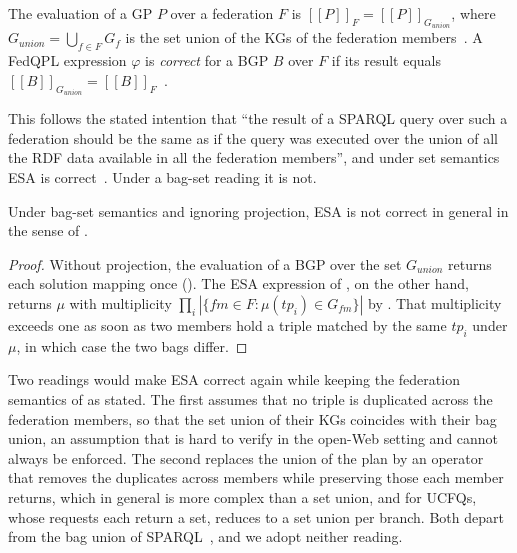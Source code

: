 \begin{definition}\label{def_fedqpl_correctness}
  The evaluation of a \ac{GP} $P$ over a federation $F$ is $[\![P]\!]_F = [\![P]\!]_{G_{\mathit{union}}}$, where $G_{\mathit{union}} = \bigcup_{f \in F} G_f$ is the set union of the \acp{KG} of the federation members~\cite[Def.~3]{Cheng2021}.
  A FedQPL expression $\varphi$ is \emph{correct} for a \ac{BGP} $B$ over $F$ if its result equals $[\![B]\!]_{G_{\mathit{union}}} = [\![B]\!]_F$~\cite[Def.~7]{Cheng2021}.
\end{definition}

This follows the stated intention that ``the result of a SPARQL query over such a federation should be the same as if the query was executed over the union of all the RDF data available in all the federation members'', and under set semantics \ac{ESA} is correct~\cite[Prop.~1]{Cheng2021}.
Under a bag-set reading it is not.

\begin{proposition}\label{prop_fedqpl_esa_incorrect}
Under bag-set semantics and ignoring projection, \ac{ESA} is not correct in general in the sense of .
\end{proposition}

\begin{proof}
  Without projection, the evaluation of a \ac{BGP} over the set $G_{\mathit{union}}$ returns each solution mapping once ().
  The \ac{ESA} expression of , on the other hand, returns $\mu$ with multiplicity $\prod_{i} |\{\mathit{fm} \in F : \mu(\mathit{tp}_i) \in G_{\mathit{fm}}\}|$ by .
  That multiplicity exceeds one as soon as two members hold a triple matched by the same $\mathit{tp}_i$ under $\mu$, in which case the two bags differ.
\end{proof}

Two readings would make \ac{ESA} correct again while keeping the federation semantics of  as stated.
The first assumes that no triple is duplicated across the federation members, so that the set union of their \acp{KG} coincides with their bag union, an assumption that is hard to verify in the open-Web setting and cannot always be enforced.
The second replaces the union of the plan by an operator that removes the duplicates across members while preserving those each member returns, which in general is more complex than a set union, and for \acp{UCFQ}, whose requests each return a set, reduces to a set union per branch.
Both depart from the bag union of SPARQL~\cite{w3SPARQLQuery}, and we adopt neither reading.

